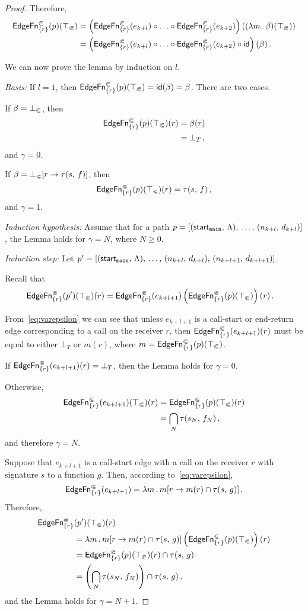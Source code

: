 \begin{proof}
  Therefore,
  \begin{align}\label{eq:edgefnbeta}
    \textsf{EdgeFn}^\Subset_{\{r\}}(p)(\top_\Subset)
      &=\left(\textsf{EdgeFn}^\Subset_{\{r\}}(e_{k+l})\circ\ldots\circ
        \textsf{EdgeFn}^\Subset_{\{r\}}(e_{k+2})\right)((\lambda m\,.\,\beta)(\top_\Subset))\notag\\
      &=\left(\textsf{EdgeFn}^\Subset_{\{r\}}(e_{k+l})\circ\ldots\circ
        \textsf{EdgeFn}^\Subset_{\{r\}}(e_{k+2})\circ\textsf{id}\right)(\beta)\,.
  \end{align}

We can now prove the lemma by induction on $l$.

\textit{Basis:}
If $l=1$, then $\textsf{EdgeFn}^\Subset_{\{r\}}(p)(\top_\Subset)=\textsf{id}(\beta)=\beta$.
There are two cases.

If $\beta=\bot_\Subset$, then 
\begin{align*}
  \textsf{EdgeFn}^\Subset_{\{r\}}(p)(\top_\Subset)(r)&=\beta(r)\\&=\bot_T\,,
\end{align*} and $\gamma=0$.

If $\beta=\bot_\Subset[r\to\tau(s,\,f)]$, then 
\[
  \textsf{EdgeFn}^\Subset_{\{r\}}(p)(\top_\Subset)(r)=\tau(s,\,f)\,,
\]
and $\gamma=1$.

\textit{Induction hypothesis:}
Assume that for a path $p=[(\textsf{start}_\texttt{main},\,\Lambda),\,\dots,\,(n_{k+l},\,d_{k+l})]$, the Lemma holds for $\gamma=N$, where $N\ge0$.

\textit{Induction step:}
Let $p'=[(\textsf{start}_\texttt{main},\,\Lambda),\,\dots,\,(n_{k+l},\,d_{k+l}),\,(n_{k+l+1},\,d_{k+l+1})]$.

Recall that
\begin{align*}
  \textsf{EdgeFn}^\Subset_{\{r\}}(p')(\top_\Subset)(r)
  &=\textsf{EdgeFn}^\Subset_{\{r\}}(e_{k+l+1})\left(\textsf{EdgeFn}^\Subset_{\{r\}}(p)(\top_\Subset)\right)(r)\,.
\end{align*}

From~\eqref{eq:varepsilon} we can see that unless $e_{k+l+1}$ is a call-start or end-return edge corresponding to a call on the receiver $r$, then $\textsf{EdgeFn}^\Subset_{\{r\}}(e_{k+l+1})(r)$ must be equal to either $\bot_T$ or $m(r)$, where $m=\textsf{EdgeFn}^\Subset_{\{r\}}(p)(\top_\Subset)$. 

If $\textsf{EdgeFn}^\Subset_{\{r\}}(e_{k+l+1})(r)=\bot_T$, then the Lemma holds for $\gamma=0$. 

Otherwise,
\begin{align*}
  \textsf{EdgeFn}^\Subset_{\{r\}}(e_{k+l+1})(\top_\Subset)(r)&=\textsf{EdgeFn}^\Subset_{\{r\}}(p)(\top_\Subset)(r)\\
  &=\bigcap_{N}\tau(s_N,\,f_N)\,,
\end{align*}
and therefore $\gamma=N$.

Suppose that $e_{k+l+1}$ is a call-start edge with a call on the receiver $r$ with signature $s$ to a function $g$. Then, according to~\eqref{eq:varepsilon}, 
\[
  \textsf{EdgeFn}^\Subset_{\{r\}}(e_{k+l+1})=\lambda m\,.\,m[r\to m(r)\cap\tau(s,\,g)]\,.
\]
Therefore,
\begin{align*}
  \textsf{EdgeFn}^\Subset_{\{r\}}&(p')(\top_\Subset)(r)\\
  &=\lambda m\,.\,m[r\to m(r)\cap\tau(s,\,g)]\left(\textsf{EdgeFn}^\Subset_{\{r\}}(p)(\top_\Subset)\right)(r)\\
  &=\textsf{EdgeFn}^\Subset_{\{r\}}(p)(\top_\Subset)(r)\cap\tau(s,\,g)\\
  &=\left(\bigcap_{N}\tau(s_N,\,f_N)\right)\cap\tau(s,\,g)\,,
\end{align*}
and the Lemma holds for $\gamma=N+1$.


\end{proof}
